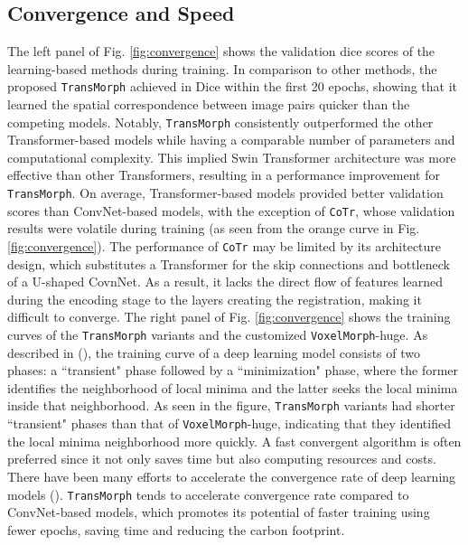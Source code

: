 \documentclass[times,twocolumn,final]{elsarticle}
\begin{document}
\subsection{Convergence and Speed}
The left panel of Fig. \ref{fig:convergence} shows the validation dice scores of the learning-based methods during training. In comparison to other methods, the proposed \texttt{TransMorph} achieved  in Dice within the first 20 epochs, showing that it learned the spatial correspondence between image pairs quicker than the competing models. Notably, \texttt{TransMorph} consistently outperformed the other Transformer-based models while having a comparable number of parameters and computational complexity. This implied Swin Transformer architecture was more effective than other Transformers, resulting in a performance improvement for \texttt{TransMorph}. On average, Transformer-based models provided better validation scores than ConvNet-based models, with the exception of \texttt{CoTr}, whose validation results were volatile during training (as seen from the orange curve in Fig. \ref{fig:convergence}). The performance of \texttt{CoTr} may be limited by its architecture design, which substitutes a Transformer for the skip connections and bottleneck of a U-shaped CovnNet. As a result, it lacks the direct flow of features learned during the encoding stage to the layers creating the registration, making it difficult to converge. The right panel of Fig. \ref{fig:convergence} shows the training curves of the \texttt{TransMorph} variants and the customized \texttt{VoxelMorph}-huge. As described in (\cite{im2016empirical, sutskever2013importance, darken1991towards}), the training curve of a deep learning model consists of two phases: a ``transient" phase followed by a ``minimization" phase, where the former identifies the neighborhood of local minima and the latter seeks the local minima inside that neighborhood. As seen in the figure, \texttt{TransMorph} variants had shorter ``transient" phases than that of \texttt{VoxelMorph}-huge, indicating that they identified the local minima neighborhood more quickly. A fast convergent algorithm is often preferred since it not only saves time but also computing resources and costs. There have been many efforts to accelerate the convergence rate of deep learning models (\cite{darken1991towards, looney1996stabilization, zeiler2013rectified, smith2019super}). \texttt{TransMorph} tends to accelerate convergence rate compared to ConvNet-based models, which promotes its potential of faster training using fewer epochs, saving time and reducing the carbon footprint.
\end{document}
